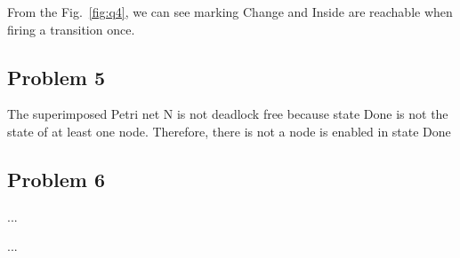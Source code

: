 \documentclass[a4paper]{article}
\begin{document}
 From the Fig.~\ref{fig:q4}, we can see marking Change and Inside are reachable when firing a transition once.
\subsection{Problem 5}
The superimposed Petri net N is not deadlock free because state Done is not the state of at least one node. Therefore, there is not a node is enabled in state Done
\subsection{Problem 6}



\begin{thebibliography}{80}


	...


	...


\end{thebibliography}
\end{document}
